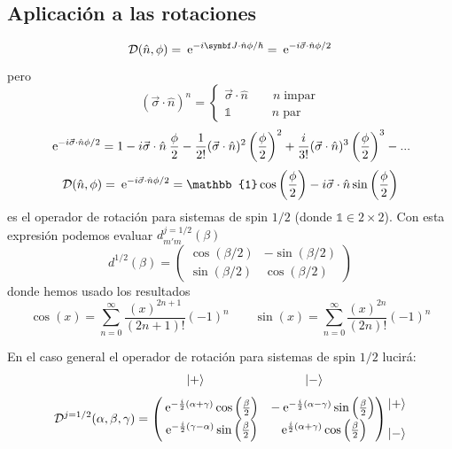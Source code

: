 \documentclass[10pt,oneside]{CBFT_book}
\begin{document}
\subsection{Aplicación a las rotaciones}

\[
	\mathcal{D}(\hat{n},\phi) = \euler^{-i \vb{J}\cdot\hat{n}\phi/\hbar} = \euler^{-i\vec{\sigma}\cdot\hat{n}\phi/2}
\]
pero 
\[
	(\vec{\sigma}\cdot\hat{n})^n = \begin{cases}
	                                \vec{\sigma}\cdot\hat{n} \qquad n \; \text{impar} \\
	                                \mathbb{1} \qquad \quad \; n \; \text{par} 
	                               \end{cases}
\]
\[
	\:\mathrm{e}^{-i\vec{\sigma}\cdot\hat{n}\phi/2} = 1 - i\vec{\sigma}\cdot\hat{n} \:\frac{\phi}{2} - 
	\frac{1}{2!} (\vec{\sigma}\cdot\hat{n})^2\left(\frac{\phi}{2}\right)^2 + 
	\frac{i}{3!} (\vec{\sigma}\cdot\hat{n})^3\left(\frac{\phi}{2}\right)^3 - ...
\]
\[
	\mathcal{D}(\hat{n},\phi) = \euler^{-i\vec{\sigma}\cdot\hat{n}\phi/2} =
	\mathbb{1}\cos\left(\frac{\phi}{2}\right) - i\vec{\sigma}\cdot\hat{n}\sin\left(\frac{\phi}{2}\right)
\]
es el operador de rotación para sistemas de spin $1/2$ (donde $\mathbb{1} \in 2\times 2$). Con esta expresión podemos 
evaluar 
$d^{j=1/2}_{m'm}(\beta)$
\[
	d^{1/2}(\beta) = \begin{pmatrix}
	     \cos(\beta/2) & -\sin(\beta/2)\\
	     \sin(\beta/2) & \cos(\beta/2)
	    \end{pmatrix}
\]
donde hemos usado los resultados 
\[
	\cos(x) = \sum_{n=0}^\infty \frac{(x)^{2n+1}}{(2n+1)!}(-1)^n \qquad 
		\sin(x) = \sum_{n=0}^\infty \frac{(x)^{2n}}{(2n)!}(-1)^n
\]

En el caso general el operador de rotación para sistemas de spin $1/2$ lucirá:
\[
	\begin{matrix} \qquad\qquad \Ket{+} \qquad\qquad\qquad\qquad \Ket{-} \end{matrix}
\]
\[
	\mathcal{D}^{j=1/2} (\alpha,\beta,\gamma) = \begin{pmatrix}
	        \:\mathrm{e}^{-\frac{i}{2}(\alpha + \gamma)} \cos\left(\frac{\beta}{2}\right) & 
			- \:\mathrm{e}^{-\frac{i}{2}(\alpha - \gamma)} \sin\left(\frac{\beta}{2}\right) \\
	        \:\mathrm{e}^{-\frac{i}{2}(\gamma -\alpha )} \sin\left(\frac{\beta}{2}\right) & 
			\:\mathrm{e}^{\frac{i}{2}(\alpha + \gamma)} \cos\left(\frac{\beta}{2}\right)
	       \end{pmatrix} 
	       \begin{matrix} \Ket{+} \\ \\  \Ket{-} \end{matrix}
\]
\end{document}
